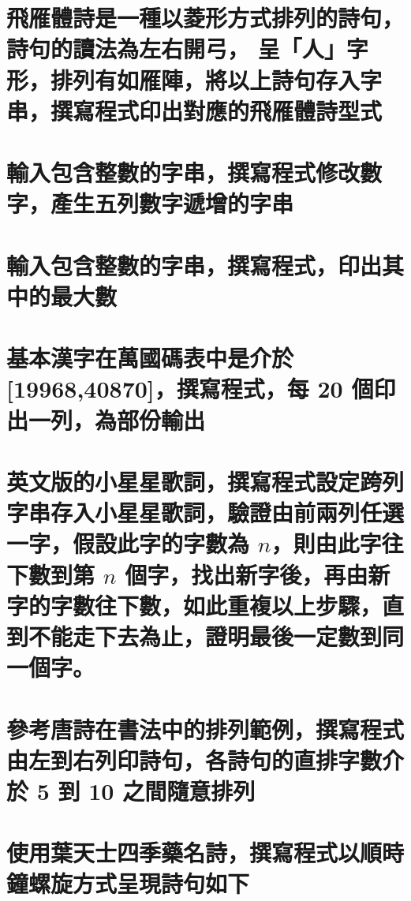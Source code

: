 \section{飛雁體詩是一種以菱形方式排列的詩句，詩句的讀法為左右開弓， 呈「人」字形，排列有如雁陣，將以上詩句存入字串，撰寫程式印出對應的飛雁體詩型式}


\section{輸入包含整數的字串，撰寫程式修改數字，產生五列數字遞增的字串}


\section{輸入包含整數的字串，撰寫程式，印出其中的最大數}


\section{基本漢字在萬國碼表中是介於 [19968,40870]，撰寫程式，每 20 個印出一列，為部份輸出}


\section{英文版的小星星歌詞，撰寫程式設定跨列字串存入小星星歌詞，驗證由前兩列任選一字，假設此字的字數為 $n$，則由此字往下數到第 $n$ 個字，找出新字後，再由新字的字數往下數，如此重複以上步驟，直到不能走下去為止，證明最後一定數到同一個字。}


\section{參考唐詩在書法中的排列範例，撰寫程式由左到右列印詩句，各詩句的直排字數介於 5 到 10 之間隨意排列}


\section{使用葉天士四季藥名詩，撰寫程式以順時鐘螺旋方式呈現詩句如下}

